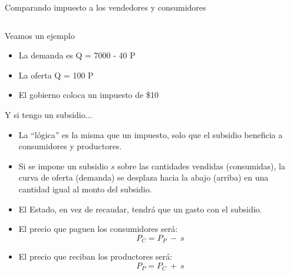 \documentclass{beamer}
\begin{document}
\begin{frame}{Comparando impuesto a los vendedores y consumidores}
\begin{columns}
\begin{column}{0.49\textwidth}
    
    \end{column}
    \end{columns}
\end{frame}

\begin{frame}{Veamos un ejemplo}
\begin{itemize}
    \item La demanda es Q = 7000 - 40 P 
    \item La oferta Q = 100 P
    \item El gobierno coloca un impuesto de \$10
\end{itemize}
\end{frame}

\begin{frame}{Y si tengo un subsidio...}
    \begin{itemize}
        \item La ``lógica'' es la misma que un impuesto, solo que el subsidio beneficia a consumidores y productores. \vspace{1mm}
        \item Si se impone un subsidio $s$ sobre las cantidades vendidas (consumidas), la curva de oferta (demanda) se desplaza hacia la abajo (arriba) en una cantidad igual al monto del subsidio.
        \vspace{1mm}
        \item El Estado, en vez de recaudar, tendrá que un gasto con el subsidio.
        \vspace{1mm}
        \item El precio que paguen los consumidores será:
            \[ P_C = P_P\ - \ s\] 
        \item El precio que reciban los productores será:
            \[ P_P = P_C\ + \ s\]       
    \end{itemize}
\end{frame}
\end{document}
